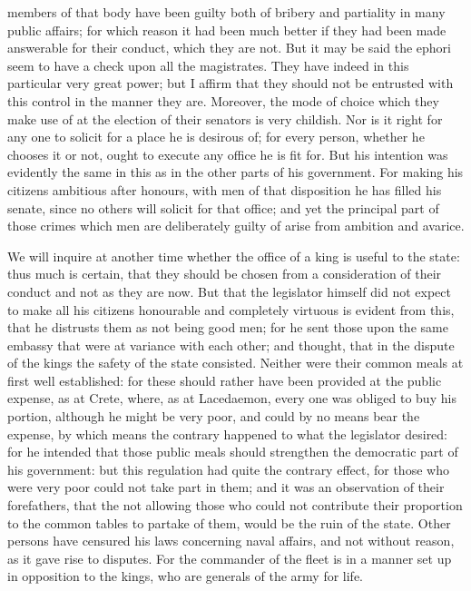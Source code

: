 members of that body have been guilty both of bribery and partiality in
many public affairs; for which reason it had been much better if they had
been made answerable for their conduct, which they are not. But it may be
said the ephori seem to have a check upon all the magistrates. They have
indeed in this particular very great power; but I affirm that they should
not be entrusted with this control in the manner they are. Moreover, the
mode of choice which they make use of at the election of their senators is
very childish. Nor is it right for any one to solicit for a place he is
desirous of; for every person, whether he chooses it or not, ought to
execute any office he is fit for. But his intention was evidently the same
in this as in the other parts of his government. For making his citizens
ambitious after honours, with men of that disposition he has filled his
senate, since no others will solicit for that office; and yet the
principal part of those crimes which men are deliberately guilty of arise
from ambition and avarice.

We will inquire at another time whether the office of a king is useful to
the state: thus much is certain, that they should be chosen from a
consideration of their conduct and not as they are now. But that the
legislator himself did not expect to make all his citizens honourable and
completely virtuous is evident from this, that he distrusts them as not
being good men; for he sent those upon the same embassy that were at
variance with each other; and thought, that in the dispute of the kings
the safety of the state consisted. Neither were their common meals at
first well established: for these should rather have been provided at the
public expense, as at Crete, where, as at Lacedaemon, every one was
obliged to buy his portion, although he might be very poor, and could by
no means bear the expense, by which means the contrary happened to what
the legislator desired: for he intended that those public meals should
strengthen the democratic part of his government: but this regulation had
quite the contrary effect, for those who were very poor could not take
part in them; and it was an observation of their forefathers, that the not
allowing those who could not contribute their proportion to the common
tables to partake of them, would be the ruin of the state. Other persons
have censured his laws concerning naval affairs, and not without reason,
as it gave rise to disputes. For the commander of the fleet is in a manner
set up in opposition to the kings, who are generals of the army for life.

